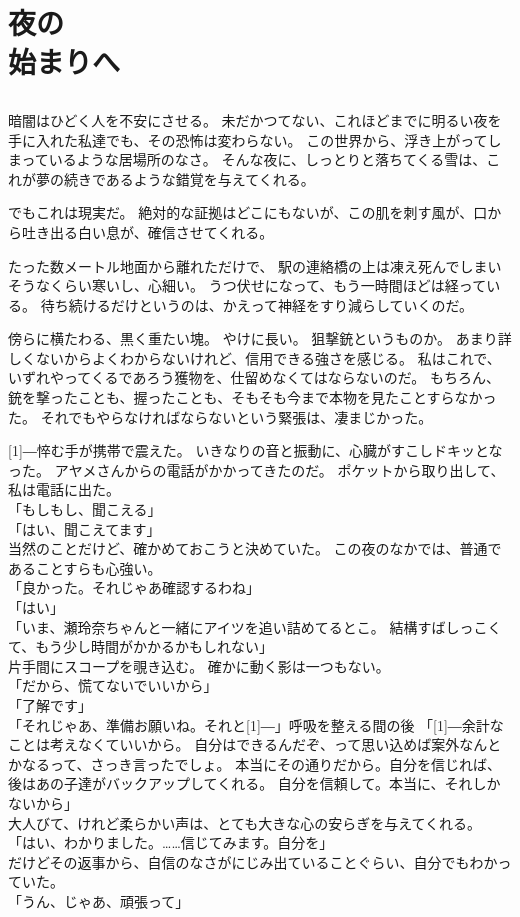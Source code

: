 \documentclass[../IHMain]{subfiles}
\begin{document}
    

\chapter{夜の\\始まりへ}
\section{}
暗闇はひどく人を不安にさせる。
未だかつてない、これほどまでに明るい夜を手に入れた私達でも、その恐怖は変わらない。
この世界から、浮き上がってしまっているような居場所のなさ。
そんな夜に、しっとりと落ちてくる雪は、これが夢の続きであるような錯覚を与えてくれる。

でもこれは現実だ。
絶対的な証拠はどこにもないが、この肌を刺す風が、口から吐き出る白い息が、確信させてくれる。

たった数メートル地面から離れただけで、
駅の連絡橋の上は凍え死んでしまいそうなくらい寒いし、心細い。
うつ伏せになって、もう一時間ほどは経っている。
待ち続けるだけというのは、かえって神経をすり減らしていくのだ。

傍らに横たわる、黒く重たい塊。
やけに長い。
狙撃銃というものか。
あまり詳しくないからよくわからないけれど、信用できる強さを感じる。
私はこれで、いずれやってくるであろう獲物を、仕留めなくてはならないのだ。
もちろん、銃を撃ったことも、握ったことも、そもそも今まで本物を見たことすらなかった。
それでもやらなければならないという緊張は、凄まじかった。

\scalebox{3}[1]{―}悴む手が携帯で震えた。
いきなりの音と振動に、心臓がすこしドキッとなった。
アヤメさんからの電話がかかってきたのだ。
ポケットから取り出して、私は電話に出た。\\
「もしもし、聞こえる」\\
「はい、聞こえてます」\\
当然のことだけど、確かめておこうと決めていた。
この夜のなかでは、普通であることすらも心強い。\\
「良かった。それじゃあ確認するわね」\\
「はい」\\
「いま、瀬玲奈ちゃんと一緒にアイツを追い詰めてるとこ。
結構すばしっこくて、もう少し時間がかかるかもしれない」\\
片手間にスコープを覗き込む。
確かに動く影は一つもない。\\
「だから、慌てないでいいから」\\
「了解です」\\
「それじゃあ、準備お願いね。それと\scalebox{3}[1]{―}」呼吸を整える間の後
「\scalebox{3}[1]{―}余計なことは考えなくていいから。
自分はできるんだぞ、って思い込めば案外なんとかなるって、さっき言ったでしょ。
本当にその通りだから。自分を信じれば、後はあの子達がバックアップしてくれる。
自分を信頼して。本当に、それしかないから」\\
大人びて、けれど柔らかい声は、とても大きな心の安らぎを与えてくれる。\\
「はい、わかりました。……信じてみます。自分を」\\
だけどその返事から、自信のなさがにじみ出ていることぐらい、自分でもわかっていた。\\
「うん、じゃあ、頑張って」
\end{document}
